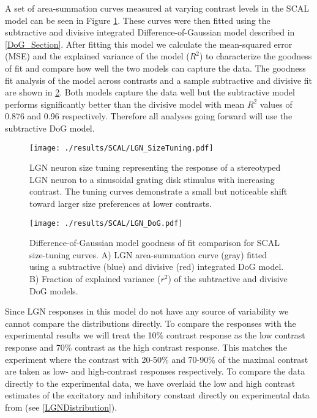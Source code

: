 A set of area-summation curves measured at varying contrast levels in
the SCAL model can be seen in Figure \ref{LGNSizeTuning}. These curves
were then fitted using the subtractive and divisive integrated
Difference-of-Gaussian model described in \ref{DoG_Section}.  After
fitting this model we calculate the mean-squared error (MSE) and the
explained variance of the model ($R^2$) to characterize the goodness
of fit and compare how well the two models can capture the data. The
goodness fit analysis of the model across contrasts and a sample
subtractive and divisive fit are shown in \ref{LGNSizeFit}. Both
models capture the data well but the subtractive model performs
significantly better than the divisive model with mean $R^2$ values of
0.876 and 0.96 respectively. Therefore all analyses going forward will
use the subtractive DoG model.

\begin{figure}
	\centering
    \texttt{[image: ./results/SCAL/LGN\_SizeTuning.pdf]}
	\caption[SCAL model size-tuning curves]{LGN neuron size tuning
      representing the response of a stereotyped LGN neuron to a
      sinusoidal grating disk stimulus with increasing contrast. The
      tuning curves demonstrate a small but noticeable shift toward
      larger size preferences at lower contrasts.}
	\label{LGNSizeTuning}
\end{figure}

\begin{figure}
	\centering
        \texttt{[image: ./results/SCAL/LGN\_DoG.pdf]}
	    \caption[SCAL model size-tuning DoG
          fit.]{Difference-of-Gaussian model goodness of fit
          comparison for SCAL size-tuning curves. A) LGN
          area-summation curve (gray) fitted using a subtractive
          (blue) and divisive (red) integrated DoG model. B) Fraction
          of explained variance ($r^2$) of the subtractive and
          divisive DoG models.}
	\label{LGNSizeFit}
\end{figure}

Since LGN responses in this model do not have any source of
variability we cannot compare the distributions directly. To compare
the responses with the experimental results we will treat the 10\%
contrast response as the low contrast response and 70\% contrast as
the high contrast response. This matches the experiment where the
contrast with 20-50\% and 70-90\% of the maximal contrast are taken as
low- and high-contrast responses respectively. To compare the data
directly to the experimental data, we have overlaid the low and high
contrast estimates of the excitatory and inhibitory constant directly
on experimental data from \cite{Sceniak2006} (see
\ref{LGNDistribution}).

